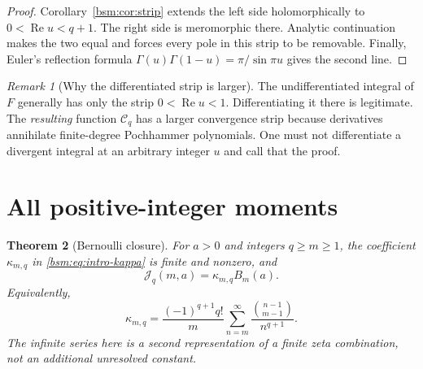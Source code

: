 \documentclass[11pt,letterpaper]{article}
\numberwithin{equation}{section}
\newtheorem{theorem}{Theorem}[section]
\theoremstyle{definition}\newtheorem{definition}[theorem]{Definition}
\theoremstyle{remark}\newtheorem{remark}[theorem]{Remark}
\DeclareMathOperator{\Ree}{Re}
\newcommand{\Ccal}{\mathcal C}
\newcommand{\Jcal}{\mathcal J}
\begin{document}
\begin{proof}
Corollary~\ref{bsm:cor:strip} extends the left side holomorphically to
$0<\Ree u<q+1$. The right side is meromorphic there. Analytic
continuation makes the two equal and forces every pole in this strip
to be removable. Finally, Euler's reflection formula
$\Gamma(u)\Gamma(1-u)=\pi/\sin\pi u$ gives the second line.
\end{proof}

\begin{remark}[Why the differentiated strip is larger]
The undifferentiated integral of $F$ generally has only the strip
$0<\Ree u<1$. Differentiating it there is legitimate. The \emph{resulting}
function $\Ccal_q$ has a larger convergence strip because derivatives
annihilate finite-degree Pochhammer polynomials. One must not differentiate
a divergent integral at an arbitrary integer $u$ and call that the proof.
\end{remark}

\section{All positive-integer moments}\label{bsm:sec:integer}

\begin{theorem}[Bernoulli closure]\label{bsm:thm:integer}
For $a>0$ and integers $q\ge m\ge1$, the coefficient
$\kappa_{m,q}$ in \eqref{bsm:eq:intro-kappa} is finite and nonzero, and
\begin{equation}\label{bsm:eq:integer-main}
 \Jcal_q(m,a)=\kappa_{m,q}B_m(a).
\end{equation}
Equivalently,
\begin{equation}\label{bsm:eq:kappa-positive}
 \kappa_{m,q}=
 \frac{(-1)^{q+1}q!}{m}
 \sum_{n=m}^\infty\frac{\binom{n-1}{m-1}}{n^{q+1}}.
\end{equation}
The infinite series here is a second representation of a finite zeta
combination, not an additional unresolved constant.
\end{theorem}
\end{document}
